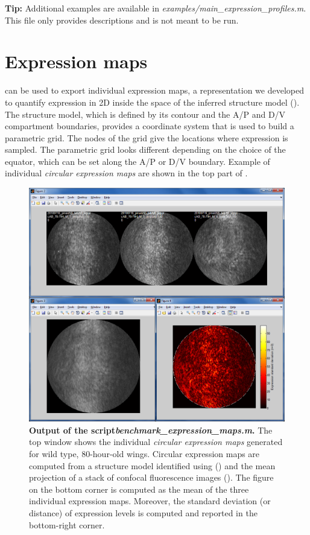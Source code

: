 \textbf{Tip:} Additional examples are available in \emph{examples/main\_expression\_profiles.m}. This file only provides descriptions and is not meant to be run.

\section{Expression maps}
\wingj can be used to export individual expression maps, a representation we developed to quantify expression in 2D inside the space of the inferred structure model (). The structure model, which is defined by its contour and the A/P and D/V compartment boundaries, provides a coordinate system that is used to build a parametric grid. The nodes of the grid give the locations where expression is sampled. The parametric grid looks different depending on the choice of the equator, which can be set along the A/P or D/V boundary. Example of individual \textit{circular expression maps} are shown in the top part of .\\

\begin{figure}[!h]
\centering
\includegraphics[scale=0.35]{images/matlab_expression_2D.jpg}
\caption{\textbf{Output of the \wingj \matlab script\textit{benchmark\_expression\_maps.m}.} The top window shows the individual \textit{circular expression maps} generated for wild type, 80-hour-old wings. Circular expression maps are computed from a structure model identified using \wingj () and the mean projection of a stack of confocal fluorescence images (). The figure on the bottom corner is computed as the mean of the three individual expression maps. Moreover, the standard deviation (or distance) of expression levels is computed and reported in the bottom-right corner.}
\label{fig:matlab_expression_2D}
\end{figure}

